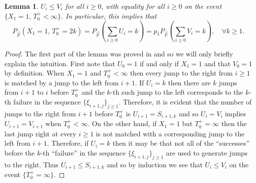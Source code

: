 \documentclass[reqno,letterpaper,11pt]{amsart}
\newtheorem{lem}[thm]{Lemma}
\theoremstyle{remark}
\theoremstyle{definition}
\begin{document}
\begin{lem}\label{TUVlem}
$U_i \leq V_i$ for all $i\geq 0$, with equality for all $i\geq 0$ on the event $\{X_1 = 1, \, T_0^+ < \infty \}$.
In particular, this implies that 
\begin{equation}\label{TUV}
P_{\vec{p}}\left(X_1 = 1, \, T_0^+ = 2k \right) = P_{\vec{p}}\left( \sum_{i\geq 0} U_i = k \right) = p_1 P_{\vec{p}}\left( \sum_{i\geq 0} V_i = k \right), \quad \forall k\geq 1. 
\end{equation}
\end{lem}
\begin{proof}
The first part of the lemma was proved in \cite[Section 4]{kzPNERW} and so we will only briefly explain the intuition. First note that $U_0 = 1$ if and only if $X_1 = 1$ and that $V_0 = 1$ by definition. When $X_1 = 1$ and $T_0^+<\infty$ then every jump to the right from $i\geq 1$ is matched by a jump to the left from $i+1$. If $U_i = k$ then there are $k$ jumps from $i+1$ to $i$ before $T_0^+$ and the $k$-th such jump to the left corresponds to the $k$-th failure in the sequence $\{\xi_{i+1,j}\}_{j\geq 1}$.
Therefore, it is evident that the number of jumps to the right from $i+1$ before $T_0^+$ is $U_{i+1} = S_{i+1,k}$ and so $U_i = V_i$ implies $U_{i+1} = V_{i+1}$ when $T_0^+ < \infty$.
On the other hand, if $X_1 = 1$ but $T_0^+ = \infty$ then the last jump right at every $i\geq 1$ is not matched with a corresponding jump to the left from $i+1$. Therefore, if $U_i = k$ then it may be that not all of the ``successes'' before the $k$-th ``failure'' in the sequence $\{ \xi_{i+1,j} \}_{j\geq 1}$ are used to generate jumps to the right. Thus $U_{i+1} \leq S_{i+1,k}$ and so by induction we see that $U_i \leq V_i$ on the event $\{T_0^+ = \infty \}$. 


\end{proof}
\end{document}
